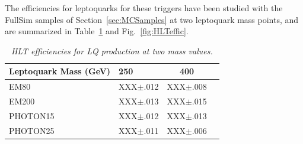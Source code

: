 The efficiencies for leptoquarks for these triggers have been studied with the FullSim 
samples of Section~\ref{sec:MCSamples} at two leptoquark mass points, and are summarized in Table~\ref{tab:HLTeffic} and 
Fig.~\ref{fig:HLTeffic}.



  \begin{table}[htbp]
    \caption{\small \sl HLT efficiencies for LQ production at two mass values.}
    \label{tab:HLTeffic}
    \begin{center}
      \begin{tabular}{|llcc|} \hline
        Leptoquark Mass (GeV)    & 250 & 400 \\ \hline
        EM80                                     & XXX$\pm$.012 & XXX$\pm$.008 \\
        EM200                                 & XXX$\pm$.013 & XXX$\pm$.015   \\ 
        PHOTON15                        & XXX$\pm$.012 & XXX$\pm$.013 &  \\ 
        PHOTON25                     & XXX$\pm$.011 & XXX$\pm$.006   \\ \hline
      \end{tabular}
    \end{center}
  \end{table}

